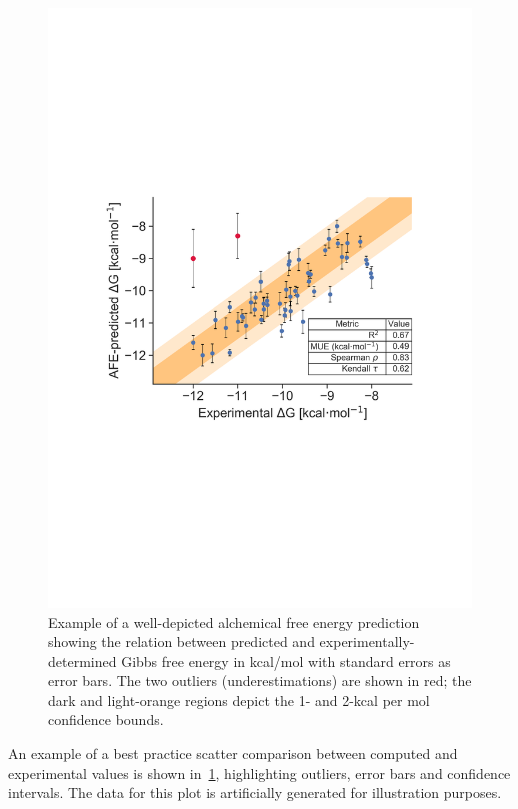 \documentclass[9pt,bestpractices]{livecoms}
\begin{document}
\begin{figure}
    \includegraphics[width=0.95\linewidth]{figures/fig13_analysis_practices/Figure.pdf}
    \caption{Example of a well-depicted alchemical free energy prediction showing the relation between predicted and experimentally-determined Gibbs free energy in kcal/mol with standard errors as error bars. The two outliers (underestimations) are shown in red; the dark and light-orange regions depict the 1- and 2-kcal per mol confidence bounds.}
    \label{fig:scatterplot_analysis}
\end{figure}
An example of a best practice scatter comparison between computed and experimental values is shown in~\ref{fig:scatterplot_analysis}, highlighting outliers, error bars and confidence intervals. The data for this plot is artificially generated for illustration purposes.
\end{document}
